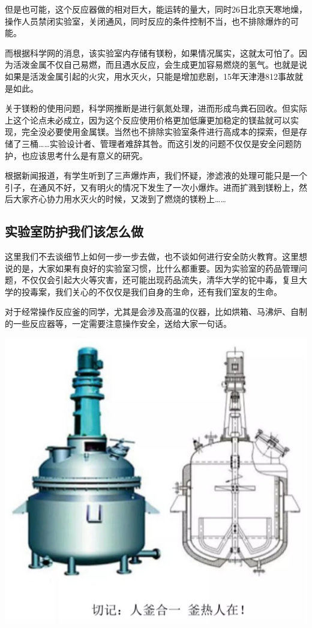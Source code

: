 \documentclass[
]{book}
\begin{document}
但是也可能，这个反应器做的相对巨大，能运转的量大，同时26日北京天寒地燥，操作人员禁闭实验室，关闭通风，同时反应的条件控制不当，也不排除爆炸的可能。

而根据科学网的消息，该实验室内存储有镁粉，如果情况属实，这就太可怕了。因为活泼金属不仅自己易燃，而且遇水反应，会生成更加容易燃烧的氢气。也就是说如果是活泼金属引起的火灾，用水灭火，只能是增加悲剧，15年天津港812事故就是如此。

关于镁粉的使用问题，科学网推断是进行氨氮处理，进而形成鸟粪石回收。但实际上这个论点未必成立，因为这个反应使用价格更加低廉更加稳定的镁盐就可以实现，完全没必要使用金属镁。当然也不排除实验室条件进行高成本的探索，但是存储了三桶\ldots\ldots 实验设计者、管理者难辞其咎。而这引发的问题不仅仅是安全问题防护，也应该思考什么是有意义的研究。

根据新闻报道，有学生听到了三声爆炸声，我们怀疑，渗滤液的处理可能只是一个引子，在通风不好，又有明火的情况下发生了一次小爆炸。进而扩溅到镁粉上，然后大家齐心协力用水灭火的时候，又泼到了燃烧的镁粉上\ldots\ldots{}

\hypertarget{ux5b9eux9a8cux5ba4ux9632ux62a4ux6211ux4eecux8be5ux600eux4e48ux505a}{%
\subsection{实验室防护我们该怎么做}\label{ux5b9eux9a8cux5ba4ux9632ux62a4ux6211ux4eecux8be5ux600eux4e48ux505a}}

这里我们不去谈细节上如何一步一步去做，也不谈如何进行安全防火教育。这里想说的是，大家如果有良好的实验室习惯，比什么都重要。因为实验室的药品管理问题，不仅仅会引起大火等灾害，还可能出现药品流失，清华大学的铊中毒，复旦大学的投毒案，我们关心的不仅仅是我们自身的生命，还有我们室友的生命。

对于经常操作反应釜的同学，尤其是会涉及高温的仪器，比如烘箱、马沸炉、自制的一些反应器等，一定需要注意操作安全，送给大家一句话。

\includegraphics[width=6.67in]{images/slybz4}
\end{document}
